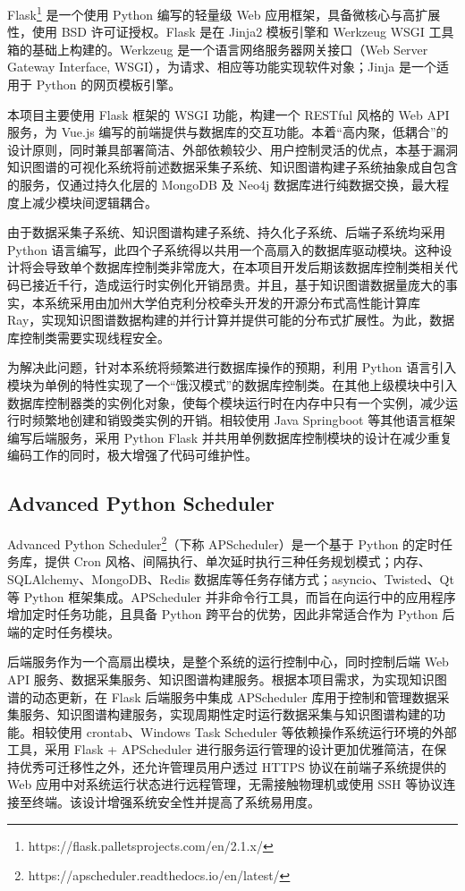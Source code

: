 \documentclass[a4paper,AutoFakeBold,oneside,12pt]{book}
\begin{document}
Flask\footnote{https://flask.palletsprojects.com/en/2.1.x/} 是一个使用 Python 编写的轻量级 Web 应用框架，具备微核心与高扩展性，使用 BSD 许可证授权。Flask 是在 Jinja2 模板引擎和 Werkzeug WSGI 工具箱的基础上构建的。Werkzeug 是一个语言网络服务器网关接口（Web Server Gateway Interface, WSGI），为请求、相应等功能实现软件对象；Jinja 是一个适用于 Python 的网页模板引擎。

本项目主要使用 Flask 框架的 WSGI 功能，构建一个 RESTful 风格的 Web API 服务，为 Vue.js 编写的前端提供与数据库的交互功能。本着“高内聚，低耦合”的设计原则，同时兼具部署简洁、外部依赖较少、用户控制灵活的优点，本基于漏洞知识图谱的可视化系统将前述数据采集子系统、知识图谱构建子系统抽象成自包含的服务，仅通过持久化层的 MongoDB 及 Neo4j 数据库进行纯数据交换，最大程度上减少模块间逻辑耦合。

由于数据采集子系统、知识图谱构建子系统、持久化子系统、后端子系统均采用 Python 语言编写，此四个子系统得以共用一个高扇入的数据库驱动模块。这种设计将会导致单个数据库控制类非常庞大，在本项目开发后期该数据库控制类相关代码已接近千行，造成运行时实例化开销昂贵。并且，基于知识图谱数据量庞大的事实，本系统采用由加州大学伯克利分校牵头开发的开源分布式高性能计算库 Ray，实现知识图谱数据构建的并行计算并提供可能的分布式扩展性。为此，数据库控制类需要实现线程安全。

为解决此问题，针对本系统将频繁进行数据库操作的预期，利用 Python 语言引入模块为单例的特性实现了一个“饿汉模式”的数据库控制类。在其他上级模块中引入数据库控制器类的实例化对象，使每个模块运行时在内存中只有一个实例，减少运行时频繁地创建和销毁类实例的开销。相较使用 Java Springboot 等其他语言框架编写后端服务，采用 Python Flask 并共用单例数据库控制模块的设计在减少重复编码工作的同时，极大增强了代码可维护性。

\subsection{Advanced Python Scheduler}

Advanced Python Scheduler\footnote{https://apscheduler.readthedocs.io/en/latest/}（下称 APScheduler）是一个基于 Python 的定时任务库，提供 Cron 风格、间隔执行、单次延时执行三种任务规划模式；内存、SQLAlchemy、MongoDB、Redis 数据库等任务存储方式；asyncio、Twisted、Qt 等 Python 框架集成。APScheduler 并非命令行工具，而旨在向运行中的应用程序增加定时任务功能，且具备 Python 跨平台的优势，因此非常适合作为 Python 后端的定时任务模块。

后端服务作为一个高扇出模块，是整个系统的运行控制中心，同时控制后端 Web API 服务、数据采集服务、知识图谱构建服务。根据本项目需求，为实现知识图谱的动态更新，在 Flask 后端服务中集成 APScheduler 库用于控制和管理数据采集服务、知识图谱构建服务，实现周期性定时运行数据采集与知识图谱构建的功能。相较使用 crontab、Windows Task Scheduler 等依赖操作系统运行环境的外部工具，采用 Flask + APScheduler 进行服务运行管理的设计更加优雅简洁，在保持优秀可迁移性之外，还允许管理员用户透过 HTTPS 协议在前端子系统提供的 Web 应用中对系统运行状态进行远程管理，无需接触物理机或使用 SSH 等协议连接至终端。该设计增强系统安全性并提高了系统易用度。
\end{document}
